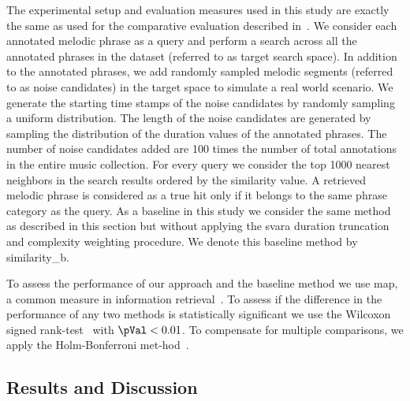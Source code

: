 The experimental setup and evaluation measures used in this study are exactly the same as used for the comparative evaluation described in~. We consider each annotated melodic phrase as a query and perform a search across all the annotated phrases in the dataset (referred to as target search space). In addition to the annotated phrases, we add randomly sampled melodic segments (referred to as noise candidates) in the target space to simulate a real world scenario. We generate the starting time stamps of the noise candidates by randomly sampling a uniform distribution. The length of the noise candidates are generated by sampling the distribution of the duration values of the annotated phrases. The number of noise candidates added are 100 times the number of total annotations in the entire music collection. For every query we consider the top 1000 nearest neighbors in the search results ordered by the similarity value. A retrieved melodic phrase is considered as a true hit only if it belongs to the same phrase category as the query. As a baseline in this study we consider the same method as described in this section but without applying the \gls{svara} duration truncation and complexity weighting procedure. We denote this baseline method by \acrshort{similarity_b}.

To assess the performance of our approach and the baseline method we use \acrfull{map}, a common measure in information retrieval~\citep{manning2008introduction}. To assess if the difference in the performance of any two methods is statistically significant we use the Wilcoxon signed rank-test~\citep{wilcoxon1945individual} with $\pVal < 0.01$. To compensate for multiple comparisons, we apply the Holm-Bonferroni met-hod~\citep{holm1979simple}.


\subsection{Results and Discussion}
\label{sec:patterns_improving_similarity_results_and_discussion}


